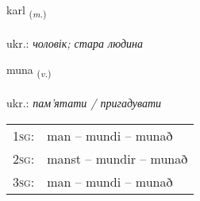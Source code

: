\documentclass[frontgrid, backgrid]{flacards}\usepackage[]{graphicx}\usepackage[]{xcolor}
\begin{document}
\renewcommand{\flhead}{\vskip5pt \fboxsep=0pt {\small\bfseries\footnotesize Nafnorð | іменник}}
\renewcommand{\fcfoot}{\vskip5pt \fboxsep=0pt \hspace{2pt}{\small\bfseries\footnotesize 1K}}

\renewcommand{\blhead}{\vskip5pt {\small\bfseries\footnotesize Nafnorð | іменник }}
\renewcommand{\bcfoot}{\vskip5pt \hspace{2pt}{\small\bfseries\footnotesize 1K}}


{karl \small{\textsubscript{(\textit{m.})}} \\[1ex] %
\textphonetic{[kʰartl̥]} \\
ukr.: \emph{чоловік; стара людина} \\  [2ex]
\renewcommand*{\arraystretch}{0.8}
}

\renewcommand{\flhead}{\vskip5pt \fboxsep=0pt {\small\bfseries\footnotesize Sagnorð | дієслово}}
\renewcommand{\fcfoot}{\vskip5pt \fboxsep=0pt \hspace{2pt}{\small\bfseries\footnotesize 1K}}

\renewcommand{\blhead}{\vskip5pt {\small\bfseries\footnotesize Sagnorð | дієслово }}
\renewcommand{\bcfoot}{\vskip5pt \hspace{2pt}{\small\bfseries\footnotesize 1K}}


{muna \small{\textsubscript{(\textit{v.})}} \\[1ex] %
\textphonetic{[mʏːna]} \\
ukr.: \emph{пам'ятати / пригадувати} \\  [2ex]
\renewcommand*{\arraystretch}{0.8}
\begin{tabular}{p{1cm}l}
\textsc{1sg}: & man -- mundi -- munað \\ 
\textsc{2sg}: & manst -- mundir -- munað \\ 
\textsc{3sg}: & man -- mundi -- munað \\ 
\end{tabular}
}
\end{document}
